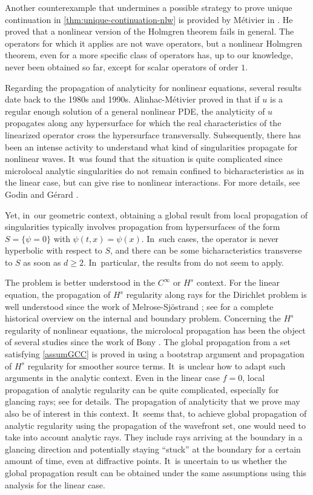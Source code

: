 \documentclass[10pt]{amsart}
\theoremstyle{definition}
\begin{document}
Another counterexample that undermines a possible strategy to prove unique continuation in \cref{thm:unique-continuation-nlw} is provided by Métivier in \cite{M:93}. He proved that a nonlinear version of the Holmgren theorem fails in general. The operators for which it applies are not wave operators, but a nonlinear Holmgren theorem, even for a more specific class of operators has, up to our knowledge, never been obtained so far, except for scalar operators of order $1$.

Regarding the propagation of analyticity for nonlinear equations, several results date back to the 1980s and 1990s. Alinhac-Métivier proved in \cite{AM:84,AM:84b} that if $u$ is a regular enough solution of a general nonlinear PDE, the analyticity of $u$ propagates along any hypersurface for which the real characteristics of the linearized operator cross the hypersurface transversally. Subsequently, there has been an intense activity to understand what kind of singularities propagate for nonlinear waves. It~was found that the situation is quite complicated since microlocal analytic singularities do not remain confined to bicharacteristics as in the linear case, but can give rise to nonlinear interactions. For more details, see Godin \cite{G:86} and Gérard \cite{G:88}.

Yet, in~our geometric context, obtaining a global result from local propagation of singularities typically involves propagation from hypersurfaces of the form $S=\{\psi=0\}$ with $\psi(t,x)=\psi(x)$. In~such cases, the operator is never hyperbolic with respect to $S$, and there can be some bicharacteristics transverse to $S$ as soon as $d\geq 2$. In~particular, the results from \cite{AM:84,AM:84b} do not seem to apply.

The problem is better understood in the $C^{\infty}$ or $H^s$ context. For the linear equation, the propagation of $H^s$ regularity along rays for the Dirichlet problem is well understood since the work of Melrose-Sjöstrand \cite{MS:78}; see \cite{H:07} for a complete historical overview on the internal and boundary problem. Concerning the $H^s$ regularity of nonlinear equations, the microlocal propagation has been the object of several studies since the work of Bony \cite{B:81}. The global propagation from a set satisfying \ref{assumGCC} is proved in \cite{DLZ03} using a bootstrap argument and propagation of $H^s$ regularity for smoother source terms. It~is unclear how to adapt such arguments in the analytic context. Even in the linear case $f=0$, local propagation of analytic regularity can be quite complicated, especially for glancing rays; see \cite{RS:81} for details. The propagation of analyticity that we prove may also be of interest in this context. It~seems that, to achieve global propagation of analytic regularity using the propagation of the wavefront set, one would need to take into account analytic rays. They include rays arriving at the boundary in a glancing direction and potentially staying ``stuck'' at the boundary for a certain amount of time, even at diffractive points. It~is uncertain to us whether the global propagation result can be obtained under the same assumptions using this analysis for the linear case.
\end{document}
